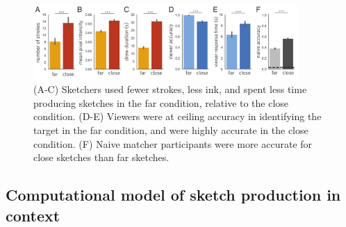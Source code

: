 \documentclass[9pt,twocolumn,twoside]{pnas-new}
\begin{document}
\begin{figure}[htbp]
\centering
\includegraphics[width=0.9\textwidth]{figures/3_behavioral_performance.pdf}
\caption{(A-C) Sketchers used fewer strokes, less ink, and spent less time producing sketches in the far condition, relative to the close condition. (D-E) Viewers were at ceiling accuracy in identifying the target in the far condition, and were highly accurate in the close condition. (F) Naive matcher participants were more accurate for close sketches than far sketches.}
\label{task_performance}
\end{figure}







\subsection*{Computational model of sketch production in context}
\end{document}

